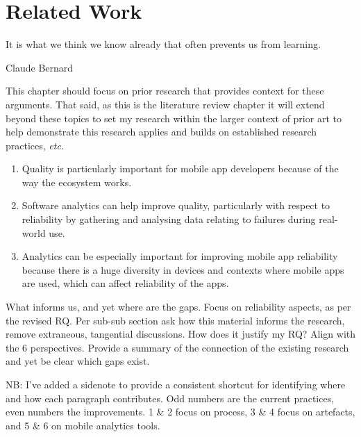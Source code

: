 \setchapterpreamble[u]{\margintoc}
\chapter{Related Work}
\label{chapter-related-work}
\epigraph{It is what we think we know already that often prevents us from learning.}{Claude Bernard} %


\bigskip
\bigskip %

\begin{kaobox}[frametitle=Context for this chapter]
This chapter should focus on prior research that provides context for these arguments. That said, as this is the literature review chapter it will extend beyond these topics to set my research within the larger context of prior art to help demonstrate this research applies and builds on established research practices, \emph{etc.}

\begin{enumerate}[start=3]
    \item Quality is particularly important for mobile app developers because of the way the ecosystem works.
    \item Software analytics can help improve quality, particularly with respect to reliability by gathering and analysing data relating to failures during real-world use.
    \item Analytics can be especially important for improving mobile app reliability because there is a huge diversity in devices and contexts where mobile apps are used, which can affect reliability of the apps.
\end{enumerate}

What informs us, and yet where are the gaps. Focus on reliability aspects, as per the revised RQ. Per sub-sub section ask how this material informs the research, remove extraneous, tangential discussions. How does it justify my RQ? Align with the 6 perspectives. Provide a summary of the connection of the existing research and yet be clear which gaps exist. 

NB: I've added a sidenote to provide a consistent shortcut for identifying where and how each paragraph contributes. Odd numbers are the current practices, even numbers the improvements. 1 \& 2 focus on process, 3 \& 4 focus on artefacts, and 5 \& 6 on mobile analytics tools.

\end{kaobox}


